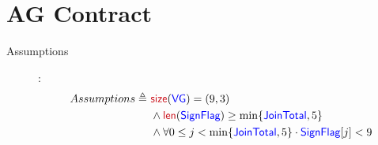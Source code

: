 \documentclass[fleqn,a4paper]{article}
\newcommand\Var[1]{\textcolor{blue}{\textsf{#1}}}
\newcommand\syntax[1]{\textcolor[RGB]{202,12,22}{\textsf{#1}}}
\newcommand\definedby{\triangleq}
\begin{document}
\newpage

\section{AG Contract}

\begin{description}

\item[Assumptions]:
\begin{align*}
Assumptions \definedby \
& \syntax{size}(\Var{VG}) = (9,3) \\
& \wedge \syntax{len}(\Var{SignFlag}) \geq \min\{\Var{JoinTotal},5\} \\
& \wedge \forall 0 \leq j < \min\{\Var{JoinTotal},5\} \cdot \Var{SignFlag}[j] < 9
\end{align*}


\end{description}
\end{document}
